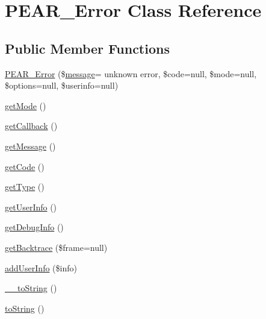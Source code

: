 \hypertarget{classPEAR__Error}{}\section{P\+E\+A\+R\+\_\+\+Error Class Reference}
\label{classPEAR__Error}
\subsection*{Public Member Functions}
\begin{DoxyCompactItemize}
\item 
\hyperlink{classPEAR__Error_a4df056a45879501a8b563c896fe608a3}{P\+E\+A\+R\+\_\+\+Error} (\$\hyperlink{classmessage}{message}= \textquotesingle{}unknown error\textquotesingle{}, \$code=null, \$mode=null, \$options=null, \$userinfo=null)
\item 
\hyperlink{classPEAR__Error_adf8ebb12d192a152c0f3f80b5ca01e7c}{get\+Mode} ()
\item 
\hyperlink{classPEAR__Error_a8060f0ee49b7346e4ca6e04aa70ae25c}{get\+Callback} ()
\item 
\hyperlink{classPEAR__Error_a00beb48b680580de68477d0f77e27510}{get\+Message} ()
\item 
\hyperlink{classPEAR__Error_a54924b41ab0d14ed7007f3c1b3f0ca82}{get\+Code} ()
\item 
\hyperlink{classPEAR__Error_acebd26397af611328c6a7125cbc6284b}{get\+Type} ()
\item 
\hyperlink{classPEAR__Error_a3933a88dc76b37aace3c333ce91f8560}{get\+User\+Info} ()
\item 
\hyperlink{classPEAR__Error_a33eade09a689fdb4e5a79727fa407f13}{get\+Debug\+Info} ()
\item 
\hyperlink{classPEAR__Error_a7892a046070c977e5fcba9fcb749673d}{get\+Backtrace} (\$frame=null)
\item 
\hyperlink{classPEAR__Error_a229db64a10b64f41644ec19cf3c1e47b}{add\+User\+Info} (\$info)
\item 
\hyperlink{classPEAR__Error_a82c4bf3c440d5b8663b214d799d08d74}{\+\_\+\+\_\+to\+String} ()
\item 
\hyperlink{classPEAR__Error_ae1b052b3d6ae9b74dbc3d348f894b6d2}{to\+String} ()
\end{DoxyCompactItemize}
